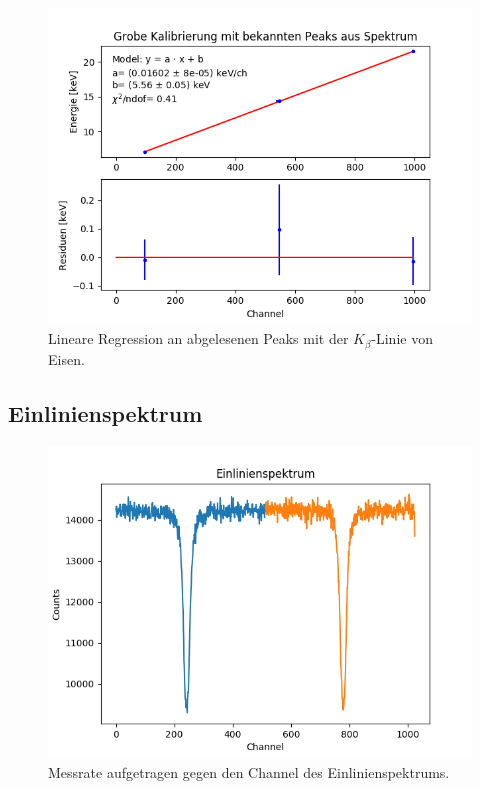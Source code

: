 \documentclass[12pt,a4paper]{article}
\begin{document}
\begin{figure} [H]
\centering
\includegraphics[scale=0.8]{Bilder/Quellspektrum/Kalibrierung_beta.png}
\caption{Lineare Regression an abgelesenen Peaks mit der $K_{\beta}$-Linie von Eisen.}
\end{figure}

\subsection{Einlinienspektrum}

\begin{figure}[H]
\centering
\includegraphics[scale=0.8]{Bilder/Einlinien/Ein_Rohdaten.png}
\caption{Messrate aufgetragen gegen den Channel des Einlinienspektrums.}
\label{fig:Ein_Roh}
\end{figure}
\end{document}

